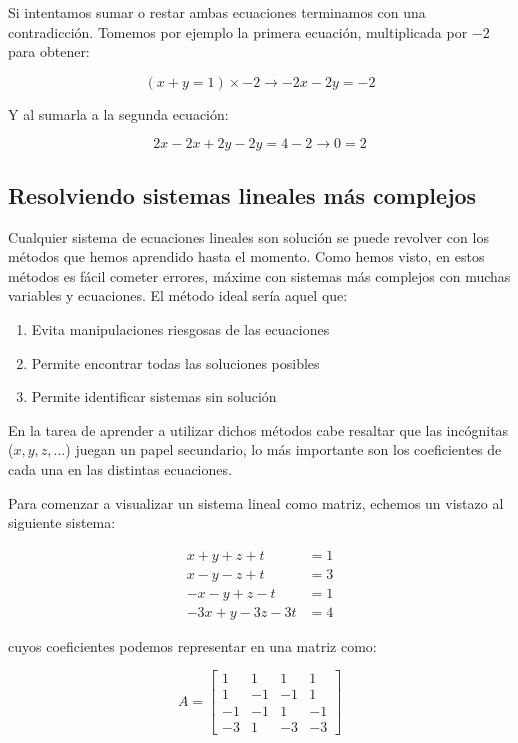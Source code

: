 \documentclass[
]{book}
\providecommand{\tightlist}{%
  \setlength{\itemsep}{0pt}\setlength{\parskip}{0pt}}
\begin{document}
Si intentamos sumar o restar ambas ecuaciones terminamos con una contradicción. Tomemos por ejemplo la primera ecuación, multiplicada por \(-2\) para obtener:

\[(x + y = 1) \times -2 \rightarrow -2x-2y = -2\]

Y al sumarla a la segunda ecuación:

\[2x - 2x + 2y - 2y = 4-2 \rightarrow 0 = 2\]

\hypertarget{resolviendo-sistemas-lineales-muxe1s-complejos}{%
\subsection{Resolviendo sistemas lineales más complejos}\label{resolviendo-sistemas-lineales-muxe1s-complejos}}

Cualquier sistema de ecuaciones lineales son solución se puede revolver con los métodos que hemos aprendido hasta el momento. Como hemos visto, en estos métodos es fácil cometer errores, máxime con sistemas más complejos con muchas variables y ecuaciones. El método ideal sería aquel que:

\begin{enumerate}
\def\labelenumi{\arabic{enumi}.}
\tightlist
\item
  Evita manipulaciones riesgosas de las ecuaciones
\item
  Permite encontrar todas las soluciones posibles
\item
  Permite identificar sistemas sin solución
\end{enumerate}

En la tarea de aprender a utilizar dichos métodos cabe resaltar que las incógnitas (\(x, y, z, \dots\)) juegan un papel secundario, lo más importante son los coeficientes de cada una en las distintas ecuaciones.

Para comenzar a visualizar un sistema lineal como matriz, echemos un vistazo al siguiente sistema:

\begin{align}
x+y+z+t & = 1 \\
x-y-z+t & = 3 \\
-x-y+z-t & = 1\\
-3x+y-3z-3t &= 4
\end{align}

cuyos coeficientes podemos representar en una matriz como:

\[A = \left[
\begin{array}{rrrr}
1 & 1 & 1 & 1 \\
1 &-1 &-1 & 1 \\
-1&-1 & 1 &-1 \\
-3& 1 &-3 &-3
\end{array}
\right]\]
\end{document}
